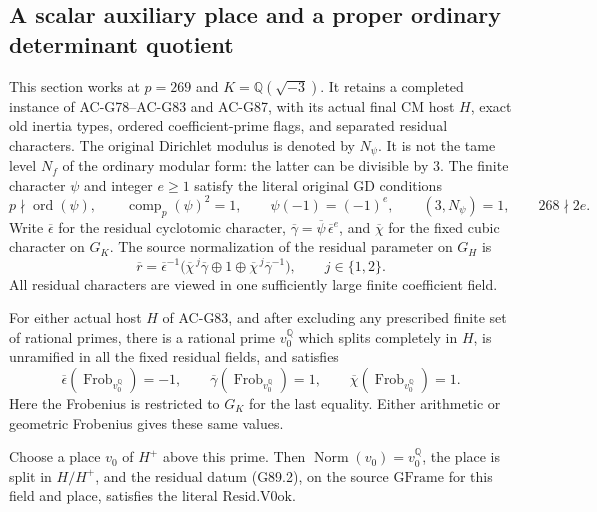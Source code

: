 \subsection{A scalar auxiliary place and a proper ordinary determinant quotient}
\label{sec:cubic-scalar-auxiliary-support}

This section works at \(p=269\) and \(K=\mathbb Q(\sqrt{-3})\).
It retains a completed instance of AC-G78--AC-G83 and AC-G87,
with its actual final CM host \(H\), exact old inertia types,
ordered coefficient-prime flags, and separated residual characters.
The original Dirichlet modulus is denoted by \(N_\psi\).
It is not the tame level \(N_f\) of the ordinary modular form:
the latter can be divisible by \(3\).
The finite character \(\psi\) and integer \(e\geq1\) satisfy the
literal original \(\mathrm{GD}\) conditions
\[
 p\nmid\operatorname{ord}(\psi),\qquad
 \operatorname{comp}_p(\psi)^2=1,\qquad
 \psi(-1)=(-1)^e,\qquad (3,N_\psi)=1,\qquad
 268\nmid2e.                                      \tag{G89.1}
\]
Write \(\overline\epsilon\) for the residual cyclotomic character,
\(\overline\gamma=\overline\psi\,\overline\epsilon^e\), and
\(\overline\chi\) for the fixed cubic character on \(G_K\).
The source normalization of the residual parameter on \(G_H\) is
\[
 \overline r=
 \overline\epsilon^{-1}
 \bigl(\overline\chi^{\,j}\overline\gamma
       \oplus1\oplus
       \overline\chi^{\,j}\overline\gamma^{-1}\bigr),
 \qquad j\in\{1,2\}.                              \tag{G89.2}
\]
All residual characters are viewed in one sufficiently large finite
coefficient field.

\begin{lemma}
\label{lem:G89-v0}
For either actual host \(H\) of AC-G83, and after excluding any
prescribed finite set of rational primes, there is a rational prime
\(v_0^{\mathbb Q}\) which splits completely in \(H\), is unramified
in all the fixed residual fields, and satisfies
\[
 \overline\epsilon(\operatorname{Frob}_{v_0^{\mathbb Q}})=-1,
 \qquad
 \overline\gamma(\operatorname{Frob}_{v_0^{\mathbb Q}})=1,
 \qquad
 \overline\chi(\operatorname{Frob}_{v_0^{\mathbb Q}})=1.
                                                        \tag{G89.3}
\]
Here the Frobenius is restricted to \(G_K\) for the last equality.
Either arithmetic or geometric Frobenius gives these same values.

Choose a place \(v_0\) of \(H^+\) above this prime.
Then \(\operatorname{Norm}(v_0)=v_0^{\mathbb Q}\), the place is split
in \(H/H^+\), and the residual datum (G89.2), on the source
\(\mathrm{GFrame}\) for this field and place, satisfies the literal
\(\mathrm{Resid.V0ok}\).
\end{lemma}

